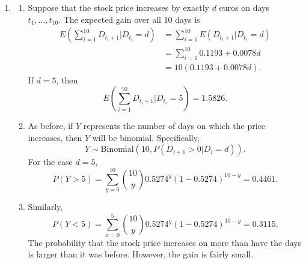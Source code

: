 \documentclass[
  letterpaper,
  DIV=11,
  numbers=noendperiod]{scrartcl}
\begin{document}
\begin{enumerate}
\def\labelenumi{\alph{enumi})}
\setcounter{enumi}{2}
\item
  \begin{enumerate}
  \def\labelenumii{\roman{enumii})}
  \item
    Suppose that the stock price increases by exactly \(d\) euros on
    days \(t_1,\ldots,t_{10}\). The expected gain over all 10 days is \[
    \begin{aligned}
    E\left(\sum_{i=1}^{10}D_{t_i+1}|D_{t_i}=d\right)
    &=\sum_{i=1}^{10} E(D_{t_i+1}|D_{t_i}=d)\\
    &=\sum_{i=1}^{10} 0.1193 + 0.0078d\\
    &=10(0.1193 + 0.0078d).
    \end{aligned}
    \] If \(d=5\), then \[
    E\left(\sum_{i=1}^{10}D_{t_i+1}|D_{t_i}=5\right)
    =1.5826.
    \]
  \item
    As before, if \(Y\) represents the number of days on which the price
    increases, then \(Y\) will be binomial. Specifically, \[
    Y \sim \mbox{Binomial}(10,P(D_{i+1}>0|D_i=d)).
    \] For the case \(d=5\), \[
     P(Y>5)
     =\sum_{y=6}^{10} {10 \choose y} 0.5274^y (1 - 0.5274)^{10-y}
     =0.4461.
      \]
  \item
    Similarly, \[
     P(Y<5)
     =\sum_{x=0}^{5} {10 \choose y} 0.5274^y (1 - 0.5274)^{10-y}
     =0.3115.
     \] The probability that the stock price increases on more than have
    the days is larger than it was before. However, the gain is fairly
    small.
  \end{enumerate}
\end{enumerate}
\end{document}
